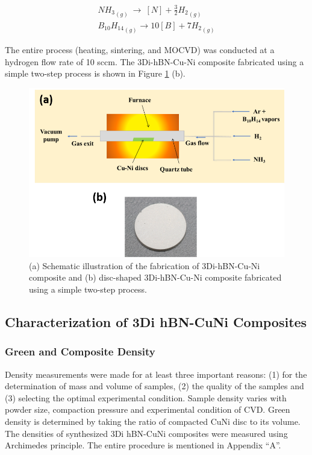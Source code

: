 \begin{gather}
\label{eq:ammonia_dissociation}
{NH_3}_{\left(g\right)}\ \rightarrow\ \left[N\right]+\frac{3}{2}{H_2}_{\left(g\right)}
\\
\label{eq:boron_dissociation}
{B_{10}H_{14}}_{\left(g\right)}\rightarrow10[B]+7{H_2}_{\left(g\right)}
\end{gather}

The entire process (heating, sintering, and MOCVD) was conducted at a hydrogen flow rate of 10 sccm. The 3Di-hBN-Cu-Ni composite fabricated using a simple two-step process is shown in Figure \ref{fig:CVD_furnace} (b).

\begin{figure}[!htb]
\centering
\includegraphics[width=\linewidth]{graphics/chapter_2/CVD_furnace}
\caption{(a) Schematic illustration of the fabrication of 3Di-hBN-Cu-Ni composite and (b) disc-shaped 3Di-hBN-Cu-Ni composite fabricated using a simple two-step process.}
\label{fig:CVD_furnace}
\end{figure}

\subsection{Characterization of 3Di hBN-CuNi Composites}

\subsubsection{Green and Composite Density}
Density measurements were made for at least three important reasons: (1) for the determination of mass and volume of samples, (2) the quality of the samples and (3) selecting the optimal experimental condition. Sample density varies with powder size, compaction pressure and experimental condition of CVD. Green density is determined by taking the ratio of compacted CuNi disc to its volume. The densities of synthesized 3Di hBN-CuNi composites were measured using Archimedes principle. The entire procedure is mentioned in Appendix “A”.

